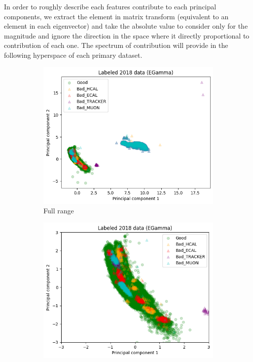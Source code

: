 In order to roughly describe each features contribute to each principal components, we extract the element in matrix transform (equivalent to an element in each eigenvector) and take the absolute value to consider only for the magnitude and ignore the direction in the space where it directly proportional to contribution of each one.
The spectrum of contribution will provide in the following hyperspace of each primary dataset.

\begin{figure}[h!]
\centering
    \begin{subfigure}[b]{0.49\linewidth}
        \includegraphics[width=\linewidth]{images/reco/2018/EGamma_subsystem_label.png}
        \caption{Full range}
    \end{subfigure}
    \begin{subfigure}[b]{0.49\linewidth}
        \includegraphics[width=\linewidth]{images/reco/2018/EGamma_subsystem_label_short_range.png}

\end{subfigure}
\end{figure}
